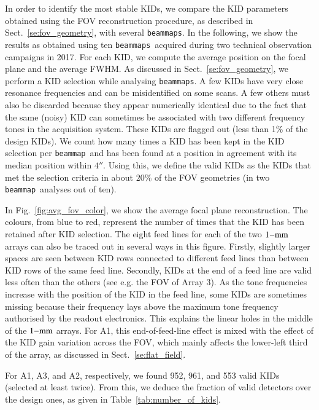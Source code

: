 \documentclass[traditionalabstract]{aa}
\newcommand{\bm}{{\tt beammap}}
\newcommand{\bms}{{\tt beammaps}}
\newcommand{\lp}[1]{#1}
\begin{document}
{In order to identify the most stable KIDs, we compare the KID parameters
obtained using the FOV reconstruction procedure, as described in
Sect.~\ref{se:fov_geometry}, with several \bms. In the following, we
show the results as obtained using {\lp ten} \bms\ acquired during two
technical observation campaigns in 2017.
For each KID, we compute the average position on the focal plane and
the average FWHM. 
As discussed in Sect.~\ref{se:fov_geometry}, we perform a KID
selection while analysing \bms. A few KIDs have very close resonance
frequencies and can be misidentified on some scans. A few others must
also be discarded because they appear
numerically identical due to the fact that the same (noisy) KID can sometimes be
associated with two different frequency tones in the acquisition system.
These KIDs are flagged out (less than 1\% of the design KIDs).
{\lp We count how many times a KID has been kept in
the KID selection per \bm\ and has been found at a position in agreement
with its median position within $4''$.}
Using this, we define the {\emph valid} KIDs as the KIDs that met the selection
criteria in about {\lp $20\%$} of the FOV geometries (in two \bm\
analyses out of ten).

In Fig.~\ref{fig:avg_fov_color}, we show the average focal plane
reconstruction. The colours, from blue to red,
represent the number of times that the KID has been retained after
KID selection. The eight feed lines for each of the two
$1\rm{-mm}$ arrays {\lp can also be traced out in several ways} in this
figure. Firstly, slightly larger spaces are seen between KID rows
connected to different feed lines than between KID rows of the same
feed line. Secondly, KIDs at the end of a feed line are valid less often than the others
(see e.g. the FOV of Array 3). As the tone frequencies
increase with the position of the KID in the feed line, some KIDs are
sometimes missing because their frequency lays above the maximum tone
frequency authorised by the readout electronics. This explains the
linear holes in the middle of the $1\rm{-mm}$ arrays. For A1, this
end-of-feed-line effect is mixed with the effect of the KID gain
variation across the FOV, which mainly affects the lower-left third of
the array, as discussed in Sect.~\ref{se:flat_field}.

For A1, A3, and A2, respectively, we found 952, 961, and 553 valid KIDs
 (selected at least twice). From this, we deduce the fraction of
valid detectors over the design ones, as given in Table~\ref{tab:number_of_kids}.


}
\end{document}
